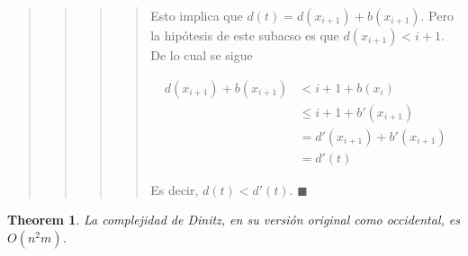\documentclass[a4paper]{article}
\newtheorem{theorem}{Theorem}
\newtheorem{theorem}{Theorem}
\begin{document}
\begin{quote}
\begin{quote}
\begin{quote}
\begin{quote}
    Esto implica que $d(t) = d(x_{i+1}) + b(x_{i+1})$. Pero 
    la hipótesis de este subacso es que $d(x_{i+1}) < i + 1$. De lo cual 
    se sigue 

    \begin{align*}
        d(x_{i+1}) + b(x_{i+1}) &< i+1 + b(x_{i})  \\ &\leq i+1 + b'(x_{i+1}) \\&= d'(x_{i+1}) + b'(x_{i+1}) \\&= d'(t)
    \end{align*}

    Es decir, $d(t) < d'(t)$. $\blacksquare$

\end{quote}
\normalsize


\end{quote}
\normalsize


\end{quote}
\normalsize


\end{quote}
\normalsize

\begin{theorem}
    La complejidad de Dinitz, en su versión original como occidental, es $O(n^2m)$.
\end{theorem}
\end{document}
